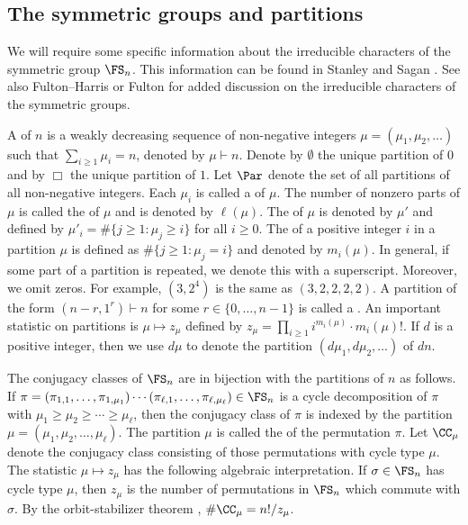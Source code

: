 \subsection{The symmetric groups and partitions}

We will require some specific information about the irreducible characters of the symmetric group \(\FS_n\).
This information can be found in Stanley \cite{EC2} and Sagan \cite{sagan}. See also Fulton--Harris \cite{FH} or Fulton \cite{fulton} for added discussion on the irreducible characters of the symmetric groups.

A  of \(n\) is a weakly decreasing sequence of non-negative integers \(\mu = (\mu_1,\mu_2,\ldots)\) such that \(\sum_{i \geq 1} \mu_i = n\), denoted by \(\mu \vdash n\).
Denote by \(\emptyset\) the unique partition of \(0\) and by \(\Box\) the unique partition of \(1\).
Let \(\Par\) denote the set of all partitions of all non-negative integers.
Each \(\mu_i\) is called a  of \(\mu\).
The number of nonzero parts of \(\mu\) is called the  of \(\mu\) and is denoted by \(\ell(\mu)\).
The  of \(\mu\) is denoted by \(\mu'\) and defined by \(\mu'_i = \# \{j \geq 1 : \mu_j \geq i\}\) for all \(i \geq 0\).
The  of a positive integer \(i\) in a partition \(\mu\) is defined as \(\# \{j \geq 1 : \mu_j = i \}\) and denoted by \(m_i (\mu)\).
In general, if some part of a partition is repeated, we denote this with a superscript.
Moreover, we omit zeros.
For example, \((3,2^4)\) is the same as \((3,2,2,2,2)\).
A partition of the form \((n-r,1^r) \vdash n\) for some \(r \in \{0,\ldots,n-1\}\) is called a .
An important statistic on partitions is \(\mu \mapsto z_\mu\) defined by \(z_\mu = \prod_{i \geq 1} i^{m_i(\mu)} \cdot m_i(\mu)!\).
If \(d\) is a positive integer, then we use \(d \mu\) to denote the partition \((d \mu_1, d \mu_2, \ldots )\) of \(dn\).

The conjugacy classes of \(\FS_n\) are in bijection with the partitions of \(n\) as follows.
If \(\pi = (\pi_{1,1},\ldots,\pi_{1,\mu_1}) \cdots (\pi_{\ell,1},\ldots,\pi_{\ell,\mu_\ell}) \in \FS_n\) is a cycle decomposition of $\pi$ with $\mu_1 \geq \mu_2 \geq \cdots \geq \mu_\ell$, then the conjugacy class of $\pi$ is indexed by the partition $\mu = (\mu_1,\mu_2,\ldots,\mu_\ell)$.
The partition \(\mu\) is called the  of the permutation $\pi$.
Let $\CC_\mu$ denote the conjugacy class consisting of those permutations with cycle type $\mu$.
The statistic $\mu \mapsto z_\mu$ has the following algebraic interpretation.
If $\sigma \in \FS_n$ has cycle type $\mu$, then $z_\mu$ is the number of permutations in $\FS_n$ which commute with $\sigma$.
By the orbit-stabilizer theorem \cite[Proposition~4.3.6]{DF},
\(\# \CC_\mu = n! / z_\mu\).


